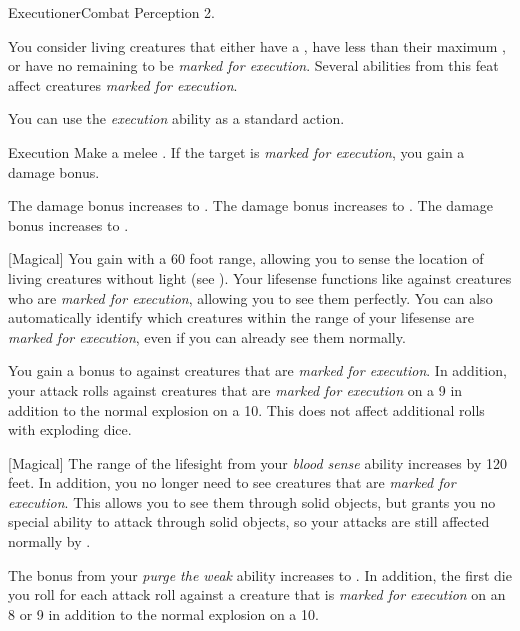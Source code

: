     \begin{feat}{Executioner}{Combat}
        \featpres Perception 2.

         You consider living creatures that either have a , have less than their maximum , or have no remaining  to be \textit{marked for execution}.
        Several abilities from this feat affect creatures \textit{marked for execution}.

         You can use the \textit{execution} ability as a standard action.
        \begin{activeability}{Execution}
            \rankline
            Make a melee .
            If the target is \textit{marked for execution}, you gain a  damage bonus.

            \rankline
             The damage bonus increases to .
             The damage bonus increases to .
             The damage bonus increases to .
        \end{activeability}

        [Magical] You gain  with a 60 foot range, allowing you to sense the location of living creatures without light (see ).
        Your lifesense functions like  against creatures who are \textit{marked for execution}, allowing you to see them perfectly.
        You can also automatically identify which creatures within the range of your lifesense are \textit{marked for execution}, even if you can already see them normally.

         You gain a  bonus to  against creatures that are \textit{marked for execution}.
        In addition, your attack rolls against creatures that are \textit{marked for execution}  on a 9 in addition to the normal explosion on a 10.
        This does not affect additional rolls with exploding dice.

        [Magical] The range of the lifesight from your \textit{blood sense} ability increases by 120 feet.
        In addition, you no longer need  to see creatures that are \textit{marked for execution}.
        This allows you to see them through solid objects, but grants you no special ability to attack through solid objects, so your attacks are still affected normally by .

         The bonus from your \textit{purge the weak} ability increases to .
        In addition, the first die you roll for each attack roll against a creature that is \textit{marked for execution}  on an 8 or 9 in addition to the normal explosion on a 10.
    \end{feat}

